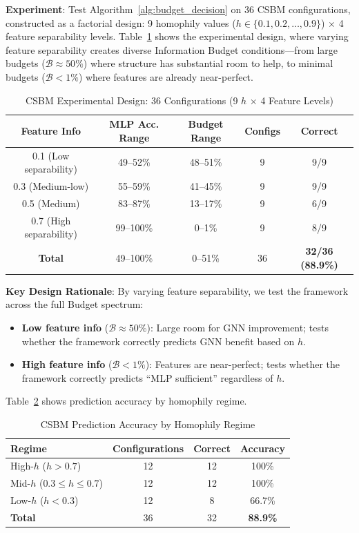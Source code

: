 \textbf{Experiment}: Test Algorithm~\ref{alg:budget_decision} on 36 CSBM configurations, constructed as a factorial design: 9 homophily values ($h \in \{0.1, 0.2, \ldots, 0.9\}$) $\times$ 4 feature separability levels. Table~\ref{tab:csbm_design} shows the experimental design, where varying feature separability creates diverse Information Budget conditions---from large budgets ($\mathcal{B} \approx 50\%$) where structure has substantial room to help, to minimal budgets ($\mathcal{B} < 1\%$) where features are already near-perfect.

\begin{table}[t]
\centering
\caption{CSBM Experimental Design: 36 Configurations (9 $h$ $\times$ 4 Feature Levels)}
\label{tab:csbm_design}
\small
\begin{tabular}{@{}ccccc@{}}
\toprule
\textbf{Feature Info} & \textbf{MLP Acc. Range} & \textbf{Budget Range} & \textbf{Configs} & \textbf{Correct} \\
\midrule
0.1 (Low separability) & 49--52\% & 48--51\% & 9 & 9/9 \\
0.3 (Medium-low) & 55--59\% & 41--45\% & 9 & 9/9 \\
0.5 (Medium) & 83--87\% & 13--17\% & 9 & 6/9 \\
0.7 (High separability) & 99--100\% & 0--1\% & 9 & 8/9 \\
\midrule
\textbf{Total} & 49--100\% & 0--51\% & 36 & \textbf{32/36 (88.9\%)} \\
\bottomrule
\end{tabular}
\end{table}

\textbf{Key Design Rationale}: By varying feature separability, we test the framework across the full Budget spectrum:
\begin{itemize}
    \item \textbf{Low feature info} ($\mathcal{B} \approx 50\%$): Large room for GNN improvement; tests whether the framework correctly predicts GNN benefit based on $h$.
    \item \textbf{High feature info} ($\mathcal{B} < 1\%$): Features are near-perfect; tests whether the framework correctly predicts ``MLP sufficient'' regardless of $h$.
\end{itemize}

Table~\ref{tab:csbm_prediction} shows prediction accuracy by homophily regime.

\begin{table}[t]
\centering
\caption{CSBM Prediction Accuracy by Homophily Regime}
\label{tab:csbm_prediction}
\begin{tabular}{@{}lccc@{}}
\toprule
\textbf{Regime} & \textbf{Configurations} & \textbf{Correct} & \textbf{Accuracy} \\
\midrule
High-$h$ ($h > 0.7$) & 12 & 12 & 100\% \\
Mid-$h$ ($0.3 \leq h \leq 0.7$) & 12 & 12 & 100\% \\
Low-$h$ ($h < 0.3$) & 12 & 8 & 66.7\% \\
\midrule
\textbf{Total} & 36 & 32 & \textbf{88.9\%} \\
\bottomrule
\end{tabular}
\end{table}

